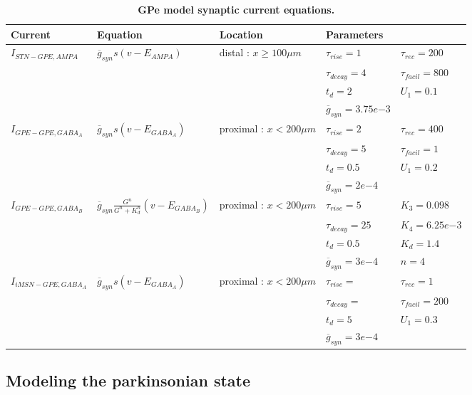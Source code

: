 \begin{table}[ht]
\centering
\caption{{\bf GPe model synaptic current equations.}}
\begin{adjustbox}{width=\textwidth}
\begin{tabular}{lllll}
\toprule
Current & Equation & Location & Parameters &  \\ \midrule
$ I_{STN−GPE,AMPA} $ & $ \overline{g}_{syn} s (v - E_{AMPA}) $ & distal : $ x \geq 100 \mu m $ & $ \tau_{rise} = 1 $ & $ \tau_{rec} = 200 $ \\
 &  &  & $ \tau_{decay} = 4 $ & $ \tau_{facil} = 800 $ \\
 &  &  & $ t_{d} = 2 $ & $ U_1 = 0.1 $ \\
 &  &  & $ \overline{g}_{syn} = 3.75 e{-3} $ &  \\ \midrule
$ I_{GPE−GPE,GABA_A} $ & $ \overline{g}_{syn} s (v - E_{GABA_A}) $ & proximal : $ x < 200 \mu m $ & $ \tau_{rise} = 2 $ & $ \tau_{rec} = 400 $ \\
 &  &  & $ \tau_{decay} = 5 $ & $ \tau_{facil} = 1 $ \\
 &  &  & $ t_{d} = 0.5 $ & $ U_1 = 0.2 $ \\
 &  &  & $ \overline{g}_{syn} = 2 e{-4} $ &  \\ \midrule
$ I_{GPE−GPE,GABA_B} $ & $ \overline{g}_{syn} \tfrac{G^n}{G^n + K_d^n} (v - E_{GABA_B}) $ & proximal : $ x < 200 \mu m $ & $ \tau_{rise} = 5 $ & $ K_3 = 0.098 $ \\
 &  &  & $ \tau_{decay} = 25 $ & $ K_4 = 6.25 e{-3} $ \\
 &  &  & $ t_{d} = 0.5 $ & $ K_d = 1.4 $ \\
 &  &  & $ \overline{g}_{syn} = 3 e{-4} $ & $ n = 4 $ \\ \midrule
$ I_{iMSN-GPE,GABA_A} $ & $ \overline{g}_{syn} s (v - E_{GABA_A}) $ & proximal : $ x < 200 \mu m $ & $ \tau_{rise} = $ & $ \tau_{rec} = 1 $ \\
 &  &  & $ \tau_{decay} = $ & $ \tau_{facil} = 200 $ \\
 &  &  & $ t_{d} = 5 $ & $ U_1 = 0.3 $ \\
 &  &  & $ \overline{g}_{syn} = 3 e{-4} $ &  \\
\bottomrule
\end{tabular}
\end{adjustbox}
%
%
\label{tab:gpe_synaptic_currents}
\end{table}


%
%
%
%
%
%

\subsection{Modeling the parkinsonian state}

